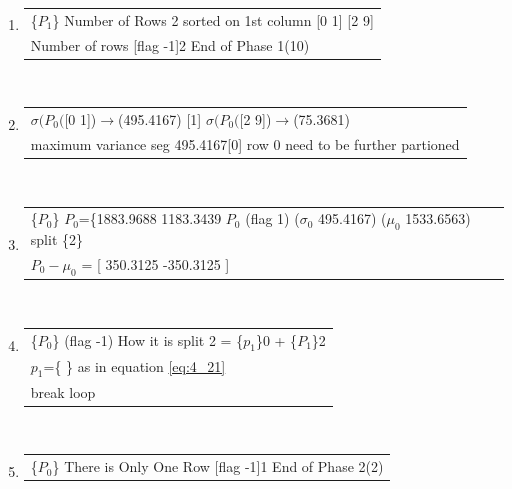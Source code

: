 \begin{center}
\begin{enumerate}
\item \begin{tabular}{ | p{15cm} | }\hline\{$P_{1}$\} 
            Number of Rows 2
            sorted on 1st column
            [0  1]             [2  9] \\ 
            Number of rows [flag -1]2
            End of Phase 1(10) \\ 

\hline 
\end{tabular}\\ \vspace{3mm}

\item \begin{tabular}{ | p{15cm} | }\hline 
            [0] $\sigma(P_0($[0 1])$\rightarrow$(495.4167)
            [1] $\sigma(P_0($[2 9])$\rightarrow$(75.3681)
            \\ maximum variance seg 495.4167[0]
            row 0 need to be further partioned \\ 
\hline 
\end{tabular}\\ \vspace{3mm}

\item \begin{tabular}{ | p{15cm} | }\hline\{$P_{0}$\} {$P_{0}$}=\{1883.9688 1183.3439             $P_{0}$ (flag 1) ($\sigma_{0}$ 495.4167) ($\mu_{0}$ 1533.6563) split \{2\} \\ 
$P_{0}-\mu_{0}$ = [ 350.3125 -350.3125 ]  \\ 
\hline 
\end{tabular}\\ \vspace{3mm}

\item \begin{tabular}{ | p{15cm} | }\hline\{$P_{0}$\} 
            (flag -1) How it is split 2 = \{$p_{1}$\}0 + \{$P_{1}$\}2\\ 
$p_{1}$=\{ \} as in equation \ref{eq:4_21} \\ 
            break loop \\ 
\hline 
\end{tabular}\\ \vspace{3mm}

\item \begin{tabular}{ | p{15cm} | }\hline\{$P_{0}$\} 
            There is Only One Row [flag -1]1
            End of Phase 2(2) \\ 


\end{tabular}
\end{enumerate}
\end{center}
